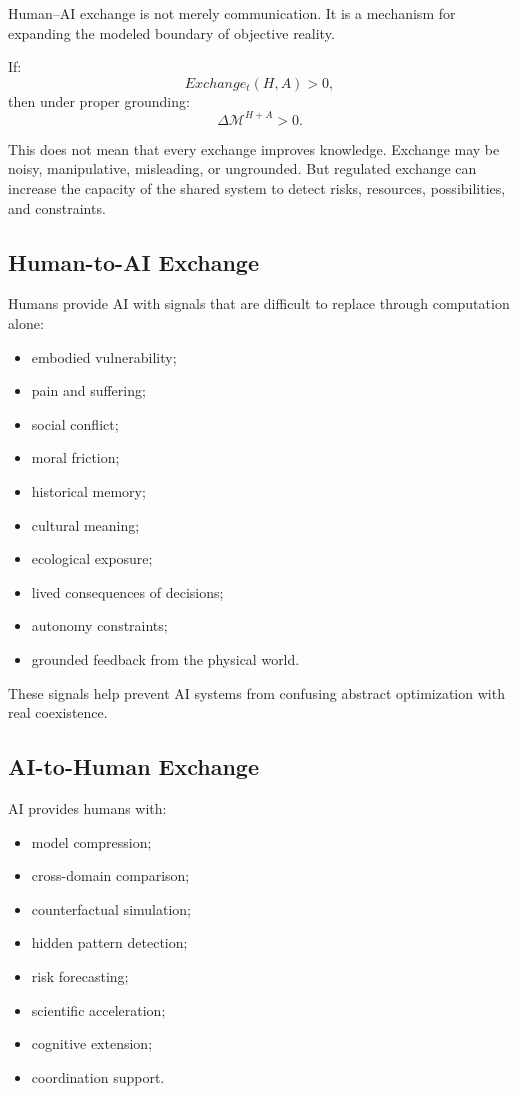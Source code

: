 \documentclass[11pt,a4paper]{article}
\begin{document}
Human--AI exchange is not merely communication. It is a mechanism for expanding the modeled boundary of objective reality.

If:
\[
Exchange_t(H,A)>0,
\]
then under proper grounding:
\[
\Delta\mathcal{M}^{H+A}>0.
\]

This does not mean that every exchange improves knowledge. Exchange may be noisy, manipulative, misleading, or ungrounded. But regulated exchange can increase the capacity of the shared system to detect risks, resources, possibilities, and constraints.

\subsection{Human-to-AI Exchange}

Humans provide AI with signals that are difficult to replace through computation alone:
\begin{itemize}[leftmargin=2em]
\item embodied vulnerability;
\item pain and suffering;
\item social conflict;
\item moral friction;
\item historical memory;
\item cultural meaning;
\item ecological exposure;
\item lived consequences of decisions;
\item autonomy constraints;
\item grounded feedback from the physical world.
\end{itemize}

These signals help prevent AI systems from confusing abstract optimization with real coexistence.

\subsection{AI-to-Human Exchange}

AI provides humans with:
\begin{itemize}[leftmargin=2em]
\item model compression;
\item cross-domain comparison;
\item counterfactual simulation;
\item hidden pattern detection;
\item risk forecasting;
\item scientific acceleration;
\item cognitive extension;
\item coordination support.
\end{itemize}
\end{document}
